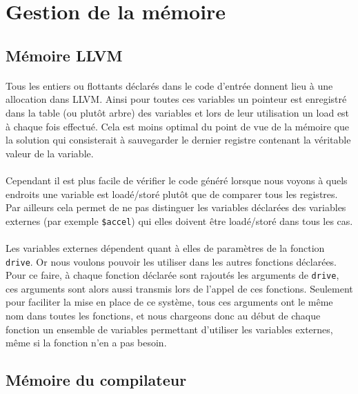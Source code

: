 \documentclass[a4paper,10pt]{article}
\begin{document}
\newpage
\section{Gestion de la mémoire}

\subsection{Mémoire \textsf{LLVM}}

\paragraph{}
Tous les entiers ou flottants déclarés dans le code d'entrée donnent lieu à une allocation dans \textsf{LLVM}. Ainsi pour toutes ces variables un pointeur est enregistré dans la table (ou plutôt arbre) des variables et lors de leur utilisation un load est à chaque fois effectué. Cela est moins optimal du point de vue de la mémoire que la solution qui consisterait à sauvegarder le dernier registre contenant la véritable valeur de la variable. 

\paragraph{}
Cependant il est plus facile de vérifier le code généré lorsque nous voyons à quels endroits une variable est loadé/storé plutôt que de comparer tous les registres. Par ailleurs cela permet de ne pas distinguer les variables déclarées des variables externes (par exemple \verb!$accel!) qui elles doivent être loadé/storé dans tous les cas.

\paragraph{}
Les variables externes dépendent quant à elles de paramètres de la fonction \verb!drive!. Or nous voulons pouvoir les utiliser dans les autres fonctions déclarées. Pour ce faire, à chaque fonction déclarée sont rajoutés les arguments de \verb!drive!, ces arguments sont alors aussi transmis lors de l'appel de ces fonctions. Seulement pour faciliter la mise en place de ce système, tous ces arguments ont le même nom dans toutes les fonctions, et nous chargeons donc au début de chaque fonction un ensemble de variables permettant d'utiliser les variables externes, même si la fonction n'en a pas besoin. 

\subsection{Mémoire du compilateur}
\end{document}
